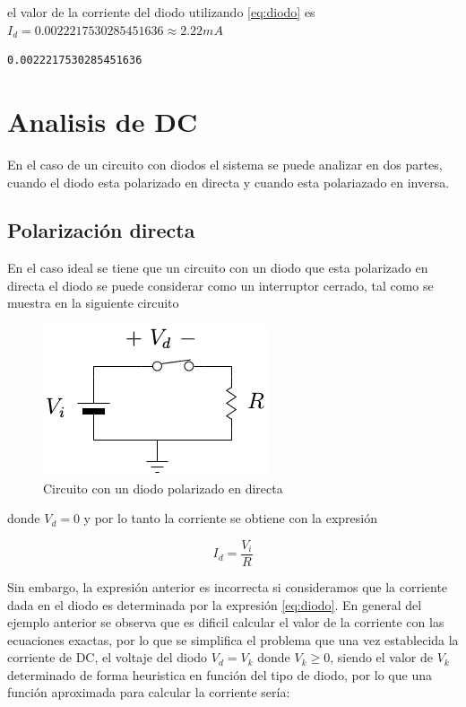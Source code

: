 \documentclass{article}
\begin{document}
    el valor de la corriente del diodo utilizando \eqref{eq:diodo} es
$I_{d}=0.0022217530285451636 \approx 2.22mA$


    
    
    \begin{verbatim}
0.0022217530285451636
    \end{verbatim}

    

    \section{Analisis de DC}\label{analisis-de-dc}

En el caso de un circuito con diodos el sistema se puede analizar en dos
partes, cuando el diodo esta polarizado en directa y cuando esta
polariazado en inversa.

\subsection{Polarización directa}\label{polarizaciuxf3n-directa}

En el caso ideal se tiene que un circuito con un diodo que esta
polarizado en directa el diodo se puede considerar como un interruptor
cerrado, tal como se muestra en la siguiente circuito

\begin{figure}[htbp]
\centering
\includegraphics{images/didodcdirecta.png}
\caption{Circuito con un diodo polarizado en directa}
\end{figure}

donde $V_{d}=0$ y por lo tanto la corriente se obtiene con la expresión

\begin{equation}
I_{d}=\frac{V_{i}}{R}
\end{equation}

Sin embargo, la expresión anterior es incorrecta si consideramos que la
corriente dada en el diodo es determinada por la expresión
\eqref{eq:diodo}. En general del ejemplo anterior se observa que es
dificil calcular el valor de la corriente con las ecuaciones exactas,
por lo que se simplifica el problema que una vez establecida la
corriente de DC, el voltaje del diodo $V_{d}=V_{k}$ donde
$V_{k} \geq 0$, siendo el valor de $V_{k}$ determinado de forma
heuristica en función del tipo de diodo, por lo que una función
aproximada para calcular la corriente sería:
\end{document}
